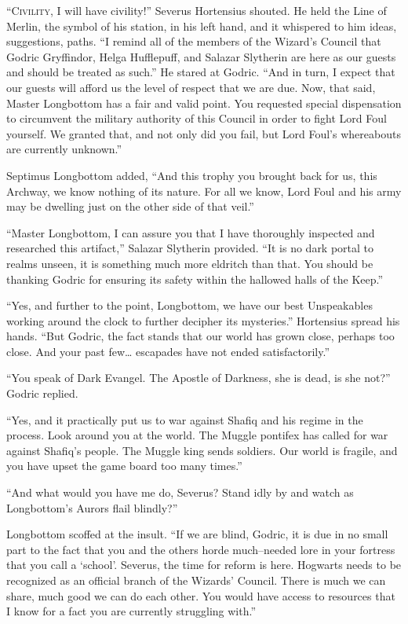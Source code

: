 \lettrine{“C}{ivility}, I will have civility!” Severus Hortensius shouted. He held the Line of Merlin, the symbol of his station, in his left hand, and it whispered to him ideas, suggestions, paths. “I remind all of the members of the Wizard’s Council that Godric Gryffindor, Helga Hufflepuff, and Salazar Slytherin are here as our guests and should be treated as such.” He stared at Godric. “And in turn, I expect that our guests will afford us the level of respect that we are due. Now, that said, Master Longbottom has a fair and valid point. You requested special dispensation to circumvent the military authority of this Council in order to fight Lord Foul yourself. We granted that, and not only did you fail, but Lord Foul’s whereabouts are currently unknown.”

Septimus Longbottom added, “And this trophy you brought back for us, this Archway, we know nothing of its nature. For all we know, Lord Foul and his army may be dwelling just on the other side of that veil.”

“Master Longbottom, I can assure you that I have thoroughly inspected and researched this artifact,” Salazar Slytherin provided. “It is no dark portal to realms unseen, it is something much more eldritch than that. You should be thanking Godric for ensuring its safety within the hallowed halls of the Keep.”

“Yes, and further to the point, Longbottom, we have our best Unspeakables working around the clock to further decipher its mysteries.” Hortensius spread his hands. “But Godric, the fact stands that our world has grown close, perhaps too close. And your past few… escapades have not ended satisfactorily.”

“You speak of Dark Evangel. The Apostle of Darkness, she is dead, is she not?” Godric replied.

“Yes, and it practically put us to war against Shafiq and his regime in the process. Look around you at the world. The Muggle pontifex has called for war against Shafiq’s people. The Muggle king sends soldiers. Our world is fragile, and you have upset the game board too many times.”

“And what would you have me do, Severus? Stand idly by and watch as Longbottom’s Aurors flail blindly?”

Longbottom scoffed at the insult. “If we are blind, Godric, it is due in no small part to the fact that you and the others horde much\mbox{--}needed lore in your fortress that you call a ‘school’. Severus, the time for reform is here. Hogwarts needs to be recognized as an official branch of the Wizards’ Council. There is much we can share, much good we can do each other. You would have access to resources that I know for a fact you are currently struggling with.”

